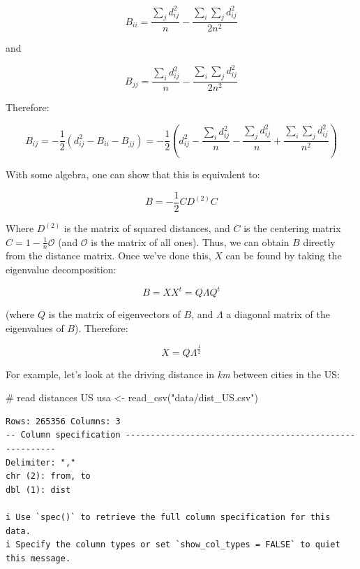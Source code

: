 \documentclass[
  letterpaper,
  DIV=11,
  numbers=noendperiod]{scrreprt}
\newenvironment{Shaded}{\begin{snugshade}}{\end{snugshade}}
\newcommand{\CommentTok}[1]{\textcolor[rgb]{0.37,0.37,0.37}{#1}}
\newcommand{\FunctionTok}[1]{\textcolor[rgb]{0.28,0.35,0.67}{#1}}
\newcommand{\NormalTok}[1]{\textcolor[rgb]{0.00,0.23,0.31}{#1}}
\newcommand{\OtherTok}[1]{\textcolor[rgb]{0.00,0.23,0.31}{#1}}
\newcommand{\StringTok}[1]{\textcolor[rgb]{0.13,0.47,0.30}{#1}}
\begin{document}
\[
B_{ii} = \frac{\sum_j d_{ij}^2}{n} - \frac{\sum_i \sum_j d_{ij}^2 }{2 n^2}
\]

and

\[
B_{jj} = \frac{\sum_i d_{ij}^2}{n} - \frac{\sum_i \sum_j d_{ij}^2 }{2 n^2}
\]

Therefore:

\[ 
B_{ij} = -\frac{1}{2}(d_{ij}^2 - B_{ii} - B_{jj}) = -\frac{1}{2}\left(d_{ij}^2 - \frac{\sum_i d_{ij}^2}{n} - \frac{\sum_j d_{ij}^2}{n}  + \frac{\sum_i \sum_j d_{ij}^2 }{n^2} \right)
\]

With some algebra, one can show that this is equivalent to:

\[B = -\frac{1}{2} C D^{(2)} C\]

Where \(D^{(2)}\) is the matrix of squared distances, and \(C\) is the
centering matrix \(C = 1 - \frac{1}{n}\mathcal O\) (and \(\mathcal O\)
is the matrix of all ones). Thus, we can obtain \(B\) directly from the
distance matrix. Once we've done this, \(X\) can be found by taking the
eigenvalue decomposition:

\[
B = X X^t = Q \Lambda Q^t
\]

(where \(Q\) is the matrix of eigenvectors of \(B\), and \(\Lambda\) a
diagonal matrix of the eigenvalues of \(B\)). Therefore:

\[ X = Q \Lambda^{\frac{1}{2}}\]

For example, let's look at the driving distance in \emph{km} between
cities in the US:

\begin{Shaded}
\begin{Highlighting}[]
\CommentTok{\# read distances US}
\NormalTok{usa }\OtherTok{\textless{}{-}} \FunctionTok{read\_csv}\NormalTok{(}\StringTok{"data/dist\_US.csv"}\NormalTok{)}
\end{Highlighting}
\end{Shaded}

\begin{verbatim}
Rows: 265356 Columns: 3
-- Column specification --------------------------------------------------------
Delimiter: ","
chr (2): from, to
dbl (1): dist

i Use `spec()` to retrieve the full column specification for this data.
i Specify the column types or set `show_col_types = FALSE` to quiet this message.
\end{verbatim}
\end{document}

